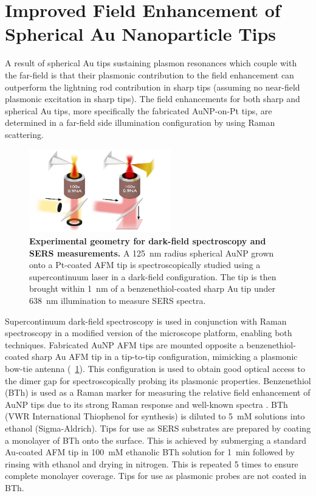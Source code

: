 \documentclass{article}
\begin{document}
\section{Improved Field Enhancement of Spherical Au Nanoparticle Tips}

A result of spherical Au tips sustaining plasmon resonances which couple with the far-field is that their plasmonic contribution to the field enhancement can outperform the lightning rod contribution in sharp tips (assuming no near-field plasmonic excitation in sharp tips). The field enhancements for both sharp and spherical Au tips, more specifically the fabricated AuNP-on-Pt tips, are determined in a far-field side illumination configuration by using Raman scattering.

\begin{figure}[bt]
\centering
\includegraphics[width=0.55\textwidth]{figures/ters_setup}
\caption[Experimental geometry for dark-field spectroscopy and SERS measurements]{\textbf{Experimental geometry for dark-field spectroscopy and SERS measurements.} A \SI{125}{nm} radius spherical AuNP grown onto a Pt-coated AFM tip is spectroscopically studied using a supercontinuum laser in a dark-field configuration. The tip is then brought within \SI{1}{nm} of a benzenethiol-coated sharp Au tip under \SI{638}{nm} illumination to measure SERS spectra.}
\label{fig:ters_setup}
\end{figure}

Supercontinuum dark-field spectroscopy is used in conjunction with Raman spectroscopy in a modified version of the microscope platform, enabling both techniques. Fabricated AuNP AFM tips are mounted opposite a benzenethiol-coated sharp Au AFM tip in a tip-to-tip configuration, mimicking a plasmonic bow-tie antenna (\figurename~\ref{fig:ters_setup}). This configuration is used to obtain good optical access to the dimer gap for spectroscopically probing its plasmonic properties. Benzenethiol (BTh) is used as a Raman marker for measuring the relative field enhancement of AuNP tips due to its strong Raman response and well-known spectra \cite{mahajan2009, dudin2010}.
BTh (VWR International Thiophenol for synthesis) is diluted to \SI{5}{mM} solutions into ethanol (Sigma-Aldrich). Tips for use as SERS substrates are prepared by coating a monolayer of BTh onto the surface. This is achieved by submerging a standard Au-coated AFM tip in \SI{100}{mM} ethanolic BTh solution for \SI{1}{\minute} followed by rinsing with ethanol and drying in nitrogen. This is repeated 5 times to ensure complete monolayer coverage. Tips for use as plasmonic probes are not coated in BTh.
\end{document}
